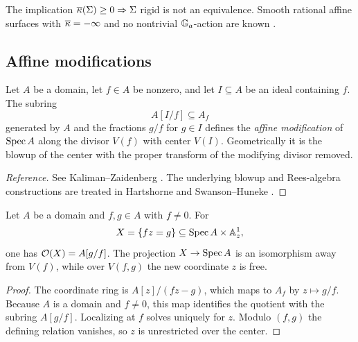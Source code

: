 \begin{warning}\label{warn:kappa-rigidity-converse}
The implication $\overline\kappa(\Sigma)\geq0\Rightarrow\Sigma$ rigid is not an equivalence.  Smooth rational affine surfaces with $\overline\kappa=-\infty$ and no nontrivial $\mathbb G_a$-action are known \cite{BandmanMakarLimanov2008}.
\end{warning}

\subsection{Affine modifications}

\begin{definition}\label{def:affine-modification}
Let $A$ be a domain, let $f\in A$ be nonzero, and let $I\subseteq A$ be an ideal containing $f$.  The subring
\[
  A[I/f]\subseteq A_f
\]
generated by $A$ and the fractions $g/f$ for $g\in I$ defines the \emph{affine modification} of $\operatorname{Spec} A$ along the divisor $V(f)$ with center $V(I)$.  Geometrically it is the blowup of the center with the proper transform of the modifying divisor removed.
\end{definition}

\begin{proof}[Reference]
See Kaliman--Zaidenberg \cite[Section 1]{KalimanZaidenberg1999}.  The underlying blowup and Rees-algebra constructions are treated in Hartshorne \cite[Chapter II, Section 7]{Hartshorne1977} and Swanson--Huneke \cite[Section 5.6]{SwansonHuneke2006}.
\end{proof}

\begin{proposition}\label{prop:hypersurface-modification}
Let $A$ be a domain and $f,g\in A$ with $f\neq0$.  For
\[
  X=\{fz=g\}\subseteq\operatorname{Spec} A\times\mathbb A^1_z,
\]
one has $\mathcal O(X)=A[g/f]$.  The projection $X\to\operatorname{Spec} A$ is an isomorphism away from $V(f)$, while over $V(f,g)$ the new coordinate $z$ is free.
\end{proposition}

\begin{proof}
The coordinate ring is $A[z]/(fz-g)$, which maps to $A_f$ by $z\mapsto g/f$.  Because $A$ is a domain and $f\neq0$, this map identifies the quotient with the subring $A[g/f]$.  Localizing at $f$ solves uniquely for $z$.  Modulo $(f,g)$ the defining relation vanishes, so $z$ is unrestricted over the center.
\end{proof}

